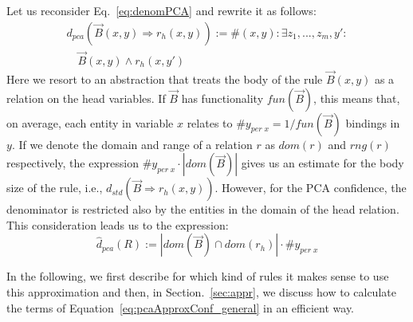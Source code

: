 \noindent Let us reconsider Eq.~\ref{eq:denomPCA} and rewrite it as follows:
\[
\begin{array}{rl}
 d_{pca}(\vec{B}(x,y) \Rightarrow r_h(x,y)) := {} \#(x,y): \exists z_1,...,z_m,y': \\ \quad \vec{B}(x, y) \wedge r_h(x,y')
\end{array}
\]
Here we resort to an abstraction that treats the body of the rule $\vec{B}(x, y)$ as a relation on the head variables.
If $\vec{B}$ has functionality $fun(\vec{B})$, this means that, on average, each entity in variable $x$
relates to $\#y_{per\; x} = 1/fun(\vec{B})$ bindings in $y$. If we denote the domain and range of a relation $r$ as
$dom(r)$ and $rng(r)$ respectively, the expression $\#y_{per\; x} \cdot |dom(\vec{B})|$ gives us
an estimate for the body size of the rule, i.e., $d_{std}(\vec{B} \Rightarrow r_h(x,y))$.
However, for the PCA confidence, the denominator is restricted also by the entities in the domain of the head relation.
This consideration leads us to the expression:
\begin{equation} \label{eq:pcaApproxConf_general}
  \widehat{d}_{pca}(R):=|dom(\vec{B}) \cap dom(r_h)|\cdot \#y_{per\; x}
\end{equation}



In the following, we first describe for which kind of rules it makes sense to use this approximation and then, in Section.~\ref{sec:appr},
we discuss how to calculate the terms of Equation~\ref{eq:pcaApproxConf_general} in an efficient way.


